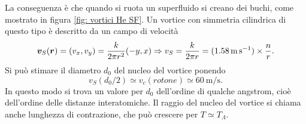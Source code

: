 La conseguenza è che quando si ruota un superfluido si creano dei buchi, come mostrato in figura \ref{fig: vortici He SF}. Un vortice con simmetria cilindrica di questo tipo è descritto da un campo di velocità 
\begin{equation}
    \bm{v}_S(\bm{r}) = (v_x,v_y) = \frac{k}{2\pi r^2}(-y,x)\Rightarrow v_S = \frac{k}{2\pi r} = (\SI{1.58}{\meter\per\second})\times\frac{n}{r}.
\end{equation}
Si può stimare il diametro $d_0$ del nucleo del vortice ponendo
\begin{equation}
    v_S(d_0/2) \simeq v_c(rotone) \simeq \SI{60}{\meter\per\second}.
\end{equation}
In questo modo si trova un valore per $d_0$ dell'ordine di qualche angstrom, cioè dell'ordine delle distanze interatomiche. Il raggio del nucleo del vortice si chiama anche lunghezza di contrazione, che può crescere per $T \simeq T_\Lambda$. 

